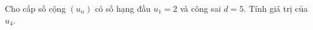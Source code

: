 \begin{ex}
Cho cấp số cộng $(u_n)$ có số hạng đầu $u_1=2$ và công sai $d=5$. Tính giá trị của $u_4$.
\end{ex}
